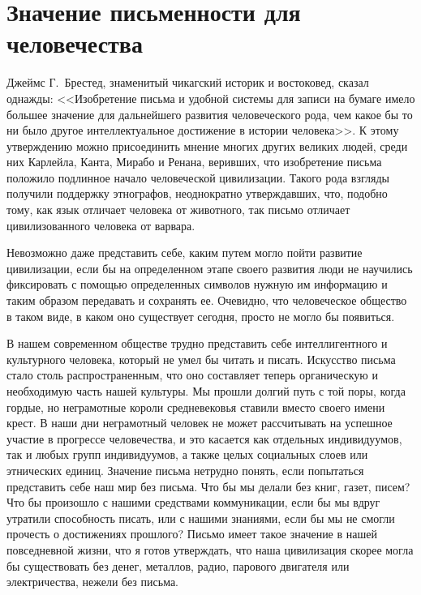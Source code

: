   \section{Значение письменности для человечества}
  
  Джеймс Г.~Брестед, знаменитый чикагский историк и востоковед, сказал однажды:
  <<Изобретение письма и удобной системы для записи на бумаге имело большее
  значение для дальнейшего развития человеческого рода, чем какое бы то ни было
  другое интеллектуальное достижение в истории человека>>. К этому утверждению
  можно присоединить мнение многих других великих людей, среди них Карлейла,
  Канта, Мирабо и Ренана, веривших, что изобретение письма положило подлинное
  начало человеческой цивилизации. Такого рода взгляды получили поддержку
  этнографов, неоднократно утверждавших, что, подобно тому, как язык отличает
  человека от животного, так письмо отличает цивилизованного человека от
  варвара.~\cite{bib:1}
  
  Невозможно даже представить себе, каким путем могло пойти развитие
  цивилизации, если бы на определенном этапе своего развития люди не научились
  фиксировать с помощью определенных символов нужную им информацию и таким
  образом передавать и сохранять ее. Очевидно, что человеческое общество в
  таком виде, в каком оно существует сегодня, просто не могло бы
  появиться.~\cite{bib:5}
  
  В нашем современном обществе трудно представить себе интеллигентного и
  культурного человека, который не умел бы читать и писать. Искусство письма
  стало столь распространенным, что оно составляет теперь органическую и
  необходимую часть нашей культуры. Мы прошли долгий путь с той поры, когда
  гордые, но неграмотные короли средневековья ставили вместо своего имени
  крест. В наши дни неграмотный человек не может рассчитывать на успешное
  участие в прогрессе человечества, и это касается как отдельных индивидуумов,
  так и любых групп индивидуумов, а также целых социальных слоев или этнических
  единиц. Значение письма нетрудно понять, если попытаться представить себе наш
  мир без письма. Что бы мы делали без книг, газет, писем? Что бы произошло с
  нашими средствами коммуникации, если бы мы вдруг утратили способность писать,
  или с нашими знаниями, если бы мы не смогли прочесть о достижениях прошлого?
  Письмо имеет такое значение в нашей повседневной жизни, что я готов
  утверждать, что наша цивилизация скорее могла бы существовать без денег,
  металлов, радио, парового двигателя или электричества, нежели без письма.
  
